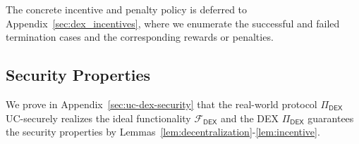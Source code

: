 \documentclass[runningheads]{llncs}
\begin{document}
The concrete incentive and penalty policy is deferred to Appendix~\ref{sec:dex_incentives}, where we enumerate the successful and failed termination cases and the corresponding rewards or penalties.
\subsection{Security Properties}
\label{sec:security-properties}


We prove in Appendix~\ref{sec:uc-dex-security} that the real-world protocol $\Pi_{\mathsf{DEX}}$ UC-securely realizes the ideal functionality $\mathcal{F}_{\mathsf{DEX}}$ and the DEX $\Pi_{\mathsf{DEX}}$ guarantees the security properties by Lemmas~\ref{lem:decentralization}-\ref{lem:incentive}.







\end{document}
